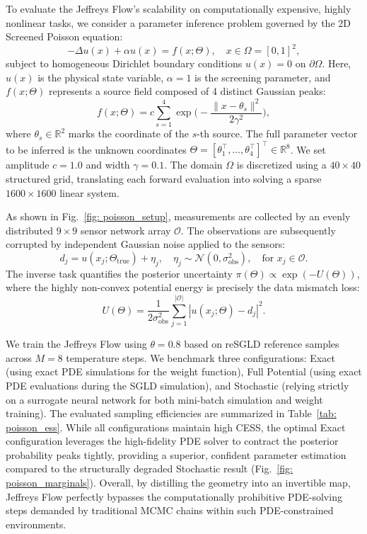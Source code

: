 \documentclass[%
 reprint,
 amsmath,amssymb,
 aps,
 pre,
]{revtex4-2}
\begin{document}
To evaluate the Jeffreys Flow's scalability on computationally expensive, highly nonlinear tasks, we consider a parameter inference problem governed by the 2D Screened Poisson equation:
\begin{equation*}
	-\Delta u(x) + \alpha u(x) = f(x; \Theta), \quad x \in \Omega = [0, 1]^2,
\end{equation*}
subject to homogeneous Dirichlet boundary conditions $u(x) = 0$ on $\partial\Omega$. Here, $u(x)$ is the physical state variable, $\alpha=1$ is the screening parameter, and $f(x; \Theta)$ represents a source field composed of 4 distinct Gaussian peaks:
\begin{equation*}
	f(x; \Theta) = c \sum_{s=1}^4 \exp \bigg( -\frac{\|x - \theta_s\|^2}{2\gamma^2} \bigg),
\end{equation*}
where $\theta_s \in \mathbb{R}^2$ marks the coordinate of the $s$-th source. The full parameter vector to be inferred is the unknown coordinates $\Theta = [\theta_1^\top, \ldots, \theta_4^\top]^\top \in \mathbb{R}^8$. We set amplitude $c = 1.0$ and width $\gamma = 0.1$. The domain $\Omega$ is discretized using a $40 \times 40$ structured grid, translating each forward evaluation into solving a sparse $1600 \times 1600$ linear system.

As shown in Fig.~\ref{fig: poisson_setup}, measurements are collected by an evenly distributed $9 \times 9$ sensor network array $\mathcal{O}$. The observations are subsequently corrupted by independent Gaussian noise applied to the sensors:
\begin{equation*}
	d_j = u(x_j; \Theta_{\text{true}}) + \eta_j, \quad \eta_j \sim \mathcal{N}(0, \sigma_{\text{obs}}^2), \quad \text{for } x_j \in \mathcal{O}.
\end{equation*}
The inverse task quantifies the posterior uncertainty $\pi(\Theta) \propto \exp(-U(\Theta))$, where the highly non-convex potential energy is precisely the data mismatch loss:
\begin{equation*}
	U(\Theta) = \frac{1}{2\sigma_{\text{obs}}^2} \sum_{j=1}^{|\mathcal{O}|} |u(x_j; \Theta) - d_j|^2.
\end{equation*}

We train the Jeffreys Flow using $\theta = 0.8$ based on reSGLD reference samples across $M = 8$ temperature steps. We benchmark three configurations: Exact (using exact PDE simulations for the weight function), Full Potential (using exact PDE evaluations during the SGLD simulation), and Stochastic (relying strictly on a surrogate neural network for both mini-batch simulation and weight training). The evaluated sampling efficiencies are summarized in Table~\ref{tab: poisson_ess}. While all configurations maintain high CESS, the optimal Exact configuration leverages the high-fidelity PDE solver to contract the posterior probability peaks tightly, providing a superior, confident parameter estimation compared to the structurally degraded Stochastic result (Fig.~\ref{fig: poisson_marginals}). Overall, by distilling the geometry into an invertible map, Jeffreys Flow perfectly bypasses the computationally prohibitive PDE-solving steps demanded by traditional MCMC chains within such PDE-constrained environments.
\end{document}
